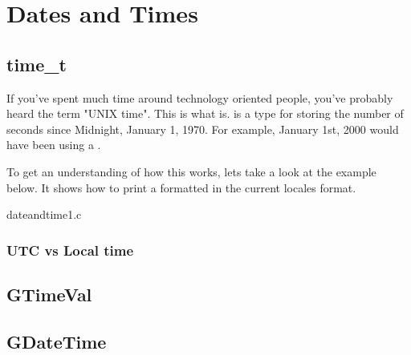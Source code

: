 \chapter{Dates and Times}

\section{time\_t}

If you've spent much time around technology oriented people, you've probably
heard the term "UNIX time". This is what  is. 
is a type for storing the number of seconds since Midnight, January 1, 1970.
For example, January 1st, 2000 would have been  using a
.

To get an understanding of how this works, lets take a look at the example
below. It shows how to print a formatted  in the current
locales format.

\begin{code}{dateandtime1.c}

\end{code}


\subsection{UTC vs Local time}

\section{GTimeVal}

\section{GDateTime}
